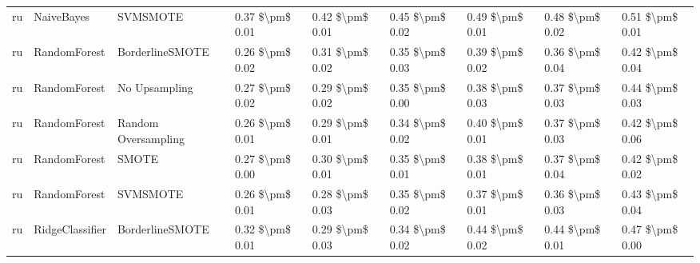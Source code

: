 \begin{tabular}{lllllllll}
      ru &                      NaiveBayes &                      SVMSMOTE & 0.37 \$\textbackslash pm\$ 0.01 &           0.42 \$\textbackslash pm\$ 0.01 &       0.45 \$\textbackslash pm\$ 0.02 &        0.49 \$\textbackslash pm\$ 0.01 &                         0.48 \$\textbackslash pm\$ 0.02 &     0.51 \$\textbackslash pm\$ 0.01 \\
      ru &                    RandomForest &               BorderlineSMOTE & 0.26 \$\textbackslash pm\$ 0.02 &           0.31 \$\textbackslash pm\$ 0.02 &       0.35 \$\textbackslash pm\$ 0.03 &        0.39 \$\textbackslash pm\$ 0.02 &                         0.36 \$\textbackslash pm\$ 0.04 &     0.42 \$\textbackslash pm\$ 0.04 \\
      ru &                    RandomForest &                 No Upsampling & 0.27 \$\textbackslash pm\$ 0.02 &           0.29 \$\textbackslash pm\$ 0.02 &       0.35 \$\textbackslash pm\$ 0.00 &        0.38 \$\textbackslash pm\$ 0.03 &                         0.37 \$\textbackslash pm\$ 0.03 &     0.44 \$\textbackslash pm\$ 0.03 \\
      ru &                    RandomForest &           Random Oversampling & 0.26 \$\textbackslash pm\$ 0.01 &           0.29 \$\textbackslash pm\$ 0.01 &       0.34 \$\textbackslash pm\$ 0.02 &        0.40 \$\textbackslash pm\$ 0.01 &                         0.37 \$\textbackslash pm\$ 0.03 &     0.42 \$\textbackslash pm\$ 0.06 \\
      ru &                    RandomForest &                         SMOTE & 0.27 \$\textbackslash pm\$ 0.00 &           0.30 \$\textbackslash pm\$ 0.01 &       0.35 \$\textbackslash pm\$ 0.01 &        0.38 \$\textbackslash pm\$ 0.01 &                         0.37 \$\textbackslash pm\$ 0.04 &     0.42 \$\textbackslash pm\$ 0.02 \\
      ru &                    RandomForest &                      SVMSMOTE & 0.26 \$\textbackslash pm\$ 0.01 &           0.28 \$\textbackslash pm\$ 0.03 &       0.35 \$\textbackslash pm\$ 0.02 &        0.37 \$\textbackslash pm\$ 0.01 &                         0.36 \$\textbackslash pm\$ 0.03 &     0.43 \$\textbackslash pm\$ 0.04 \\
      ru &                 RidgeClassifier &               BorderlineSMOTE & 0.32 \$\textbackslash pm\$ 0.01 &           0.29 \$\textbackslash pm\$ 0.03 &       0.34 \$\textbackslash pm\$ 0.02 &        0.44 \$\textbackslash pm\$ 0.02 &                         0.44 \$\textbackslash pm\$ 0.01 &     0.47 \$\textbackslash pm\$ 0.00 \\

\end{tabular}
